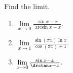 Find the limit.
\begin{multicols}{2}
\begin{enumerate}[ref={\fcProblemRef}]
\item $\displaystyle \lim\limits_{x\to 0} \frac{\sin x-x }{\arcsin x-x } $.
\item \label{problemLHospital (sin (pi x) ln x )/ (cos pi x +1)}  $\displaystyle \lim\limits_{x\to 1} \frac{\sin \left(\pi x\right)\ln x }{\cos(\pi x)+1 } $.
\item \label{problemlim x to 0 (sin x - x)/(arctan x - x)} $\lim\limits_{x\to 0}\frac{\sin x- x}{\Arctan x -x}$.

\end{enumerate}
\end{multicols}